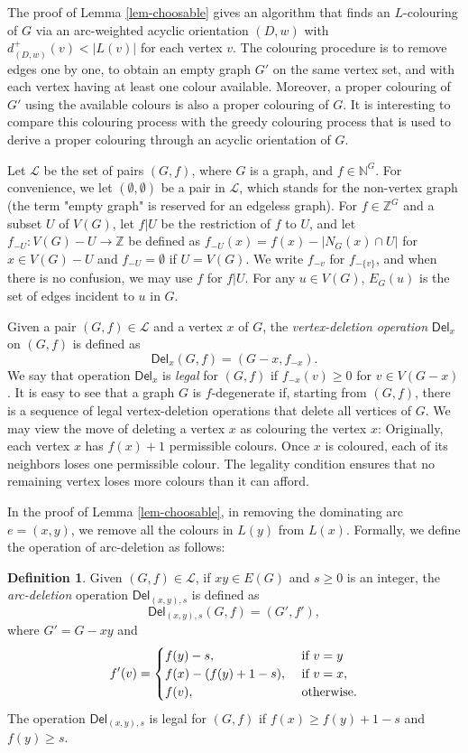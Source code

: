 \documentclass[11pt,a4paper]{article}
\theoremstyle{definition}
\newtheorem{definition}{Definition}
\newcommand{\dd}{\textsf{Del}}
\newcommand{\ed}{\textsf{Del}}
\begin{document}
The proof of Lemma \ref{lem-choosable} gives an algorithm that finds an $L$-colouring of $G$ via an arc-weighted acyclic orientation $(D,w)$ with $d_{(D,w)}^+(v)< |L(v)|$ for each vertex $v$. The colouring procedure is to remove edges one by one, to obtain an empty graph $G'$ on the same vertex set,
and with each vertex having at least one colour available. Moreover, a proper colouring of $G'$ using the available colours is also a proper colouring of $G$. It is interesting to compare this colouring process with the greedy colouring process that is used to derive a proper colouring through an acyclic orientation of $G$. 

Let $\mathcal{L}$ be the set of pairs $(G,f)$, where $G$ is a graph, and $f \in \mathbb{N}^G$. For convenience, we let $(\emptyset, \emptyset)$ be a pair in $\mathcal{L}$, which stands for the non-vertex graph (the term "empty graph" is reserved for an edgeless graph). For $f \in \mathbb{Z}^G$ and a subset $U$ of $V(G)$, let $f|U$ be the restriction of $f$ to $U$, and let  $f_{-U}: V(G)-U \to \mathbb{Z}$ be defined as 
		$f_{-U}(x) = f(x) - |N_G(x) \cap U|$ for $x \in V(G)-U$ and $f_{-U}=\emptyset$ if $U=V(G)$.
We write $f_{-v}$ for $f_{-\{v\}}$, and 
  when there is no confusion, we may use   $f$ for $f|U$.
		For any $u\in V(G)$,    $E_G(u)$  is the set of edges incident to  $u$ in $G$.
   


Given a pair $(G,f) \in \mathcal{L}$ and a vertex $x$ of $G$, the {\em vertex-deletion  operation} $\dd_x$ on $(G,f)$ is defined as   
	$$\dd_x(G,f)=(G-x,f_{-x}). $$
We say that operation $\dd_x$ is {\em legal} for $(G,f)$ if $f_{-x} (v) \ge 0$ for   $v \in V(G-x)$. It is easy to see that a graph $G$ is   $f$-degenerate if, starting from $(G,f)$, there is a sequence of legal vertex-deletion operations that delete all vertices of $G$. We may view the move of deleting a vertex $x$ as colouring the vertex $x$: Originally, each vertex $x$ has $f(x)+1$ permissible colours. Once $x$ is coloured, each of its neighbors loses one permissible colour. The legality condition ensures that no remaining vertex loses more colours than it can afford.
 

In the proof of Lemma \ref{lem-choosable}, in removing the dominating arc $e=(x,y)$,
we remove all the colours in $L(y)$ from $L(x)$. Formally, we define
the operation of arc-deletion as follows:

		
\begin{definition}
    \label{def-ed}
     Given $(G, f) \in \mathcal{L}$, if $xy \in E(G)$  and $s \ge 0$ is an integer, the {\em arc-deletion} operation  $\ed_{(x,y),s}$ is defined as $$\ed_{(x,y),s}(G,f)=(G', f'),$$
     where $G'=G-xy$ and 
     \[
     f'(v) = \begin{cases}
         f(y)-s, &\text{ if $v=y$} \cr 
         f(x) - (f(y)+1-s), &\text{ if $v=x$}, \cr 
         f(v), &\text{ otherwise.}
     \end{cases}
     \]
     The operation  $\ed_{(x,y),s}$ is legal for $(G,f)$ if $f(x) \ge  f(y)+1-s$ and $f(y) \ge s$. 
\end{definition}
\end{document}
